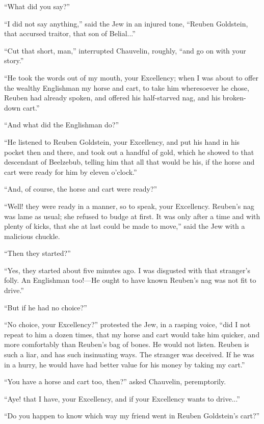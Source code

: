 \enquote{What did you say?}

\enquote{I did not say anything,} said the Jew in an injured tone, \enquote{Reuben Goldstein, that accursed traitor, that son of Belial...}

\enquote{Cut that short, man,} interrupted Chauvelin, roughly, \enquote{and go on with your story.}

\enquote{He took the words out of my mouth, your Excellency; when I was about to offer the wealthy Englishman my horse and cart, to take him wheresoever he chose, Reuben had already spoken, and offered his half-starved nag, and his broken-down cart.}

\enquote{And what did the Englishman do?}

\enquote{He listened to Reuben Goldstein, your Excellency, and put his hand in his pocket then and there, and took out a handful of gold, which he showed to that descendant of Beelzebub, telling him that all that would be his, if the horse and cart were ready for him by eleven o'clock.}

\enquote{And, of course, the horse and cart were ready?}

\enquote{Well! they were ready in a manner, so to speak, your Excellency. Reuben's nag was lame as usual; she refused to budge at first. It was only after a time and with plenty of kicks, that she at last could be made to move,} said the Jew with a malicious chuckle.

\enquote{Then they started?}

\enquote{Yes, they started about five minutes ago. I was disgusted with that stranger's folly. An Englishman too!---He ought to have known Reuben's nag was not fit to drive.}

\enquote{But if he had no choice?}

\enquote{No choice, your Excellency?} protested the Jew, in a rasping voice, \enquote{did I not repeat to him a dozen times, that my horse and cart would take him quicker, and more comfortably than Reuben's bag of bones. He would not listen. Reuben is such a liar, and has such insinuating ways. The stranger was deceived. If he was in a hurry, he would have had better value for his money by taking my cart.}

\enquote{You have a horse and cart too, then?} asked Chauvelin, peremptorily.

\enquote{Aye! that I have, your Excellency, and if your Excellency wants to drive...}

\enquote{Do you happen to know which way my friend went in Reuben Goldstein's cart?}

